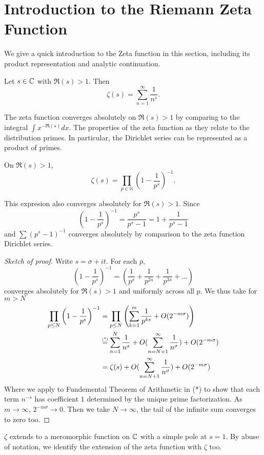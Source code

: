 \section{Introduction to the Riemann Zeta Function}
We give a quick introduction to the Zeta function in this section, including its product representation and analytic continuation.
\begin{definition}
	Let $s\in\mathbb{C}$ with $\Re(s)>1$. Then \begin{equation}
	\zeta(s)=\sum_{n=1}^{\infty}\frac{1}{n^s}.
	\end{equation}
\end{definition}
The zeta function converges absolutely on $\Re(s)>1$ by comparing to the integral $\int x^{-\Re(s)} dx$.
The properties of the zeta function as they relate to the distribution primes. In particular, the Dirichlet series can be represented as a product of primes.
\begin{proposition}\label{eulerproduct}
	On $\Re(s)>1$, \begin{equation}
		\zeta(s) = \prod_{p\in\mathbb{N}}\left(1-\frac{1}{p^s}\right)^{-1}.	
	\end{equation}
\end{proposition}
\begin{remark}
	This expresion also converges absolutely for $\Re(s)>1$. Since \[
		\left(1-\frac{1}{p^s}\right)^{-1} = \frac{p^s}{p^s-1} = 1 + \frac{1}{p^s-1}
	\]
	and $\sum(p^s-1)^{-1}$ converges absolutely by comparison to the zeta function Dirichlet series.
\end{remark}
\begin{proof}[Sketch of proof]
	Write $s=\sigma+it$. For each $p$,\[
		\left(1-\frac{1}{p^s}\right)^{-1} = \left(\frac{1}{p^s}+\frac{1}{p^{2s}}+\frac{1}{p^{3s}}+...\right)
	\]
	converges absolutely for $\Re(s)>1$ and uniformly across all $p$. We thus take for $m>N$ \begin{align*}
		\prod_{p\leq N}\left(1-\frac{1}{p^s}\right)^{-1}  &= \prod_{p\leq N}\left(\sum_{k=1}^{m} \frac{1}{p^{ks}}+O(2^{-m\sigma})\right)\\
		&\stackeq{(*)}\sum_{n=1}^{N}\frac{1}{n^s}+O(\sum_{n=N+1}^{\infty} \frac{1}{n^\sigma}) + O(2^{-m\sigma})\\
		&=\zeta(s) + O(\sum_{n=N+1}^{\infty} \frac{1}{n^\sigma}) + O(2^{-m\sigma})
	\end{align*}
	Where we apply to Fundemental Theorem of Arithmetic in (*) to show that each term $n^{-s}$ has coefficient $1$ determined by the unique prime factorization.
	As $m\to\infty$, $2^{-m\sigma} \to 0$. Then we take $N\to\infty$, the tail of the infinite sum converges to zero too.
\end{proof}
\begin{proposition} \label{analyticcontinuation}
	$\zeta$ extends to a meromorphic function on $\mathbb{C}$ with a simple pole at $s=1$. By abuse of notation, we identify the extension of the zeta function with $\zeta$ too.
\end{proposition}

